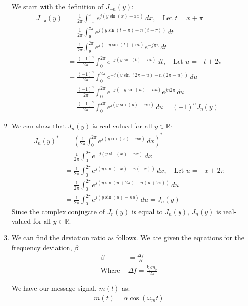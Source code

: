 \documentclass{article}
\begin{document}
\begin{enumerate}[label=1.\arabic*]
    We start with the definition of $J_{-n}(y)$:
    \begin{align*}
        J_{-n}(y) &= \frac{1}{2\pi} \int_{-\pi}^{\pi} e^{j(y\sin(x)+nx)} \, dx, \quad \text{Let } t = x + \pi \\
        &= \frac{1}{2\pi} \int_{0}^{2\pi} e^{j(y\sin(t-\pi)+n(t-\pi))} \, dt \\
        &= \frac{1}{2\pi} \int_{0}^{2\pi} e^{j(-y\sin(t)+nt)}e^{-j\pi n} \, dt \\
        &= \frac{(-1)^n}{2\pi} \int_{0}^{2\pi} e^{-j(y\sin(t)-nt)} \, dt, \quad \text{Let } u = -t + 2\pi \\
        &= \frac{(-1)^n}{2\pi}\int_{0}^{2\pi}e^{-j(y\sin(2\pi - u) - n(2\pi - u))} \, du \\
        &= \frac{(-1)^n}{2\pi}\int_{0}^{2\pi} e^{-j(-y\sin(u) +nu)}e^{jn2\pi} \, du \\
        &= \frac{(-1)^n}{2\pi}\int_{0}^{2\pi}e^{j(y\sin(u) - nu)} \, du = (-1)^n J_n(y)
    \end{align*}

    \item We can show that $J_n(y)$ is real-valued for all $y \in \mathbb{R}$:
    \begin{align*}
        J_n(y)^* &= \left( \frac{1}{2\pi} \int_{0}^{2\pi} e^{j(y\sin(x)-nx)} \, dx \right)^* \\
        &= \frac{1}{2\pi} \int_{0}^{2\pi} e^{-j(y\sin(x)-nx)} \, dx \\
        &= \frac{1}{2\pi} \int_{0}^{2\pi} e^{j(y\sin(-x)-n(-x))} \, dx, \quad \text{Let } u = -x + 2\pi \\
        &= \frac{1}{2\pi} \int_{0}^{2\pi} e^{j(y\sin(u+2\pi)-n(u+2\pi))} \, du \\ 
        &= \frac{1}{2\pi} \int_{0}^{2\pi} e^{j(y\sin(u)-nu)} \, du = J_n(y)
    \end{align*}
    Since the complex conjugate of $J_n(y)$ is equal to $J_n(y)$, $J_n(y)$ is real-valued for all $y \in \mathbb{R}$.

    \item We can find the deviation ratio as follows. We are given the equations for the frequency deviation, $\beta$
    \begin{align*}
        \beta &= \frac{\Delta f}{B} \\
        \text{Where } &\Delta f = \frac{k_f m_p}{2\pi}
    \end{align*}

    We have our message signal, $m(t)$ as:
    \begin{align*}
        m(t) = \alpha \cos(\omega_m t)
    \end{align*}


\end{enumerate}
\end{document}
